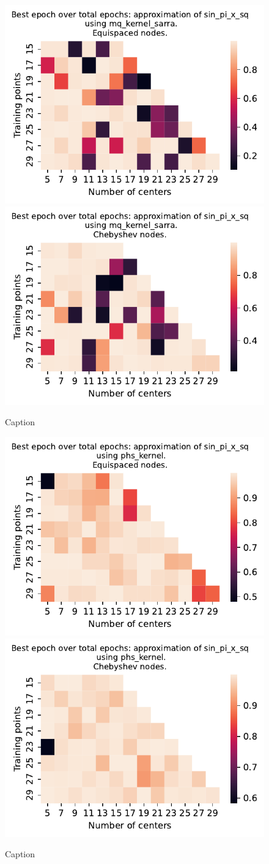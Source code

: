 \documentclass[12pt]{report} %
\begin{document}
\begin{figure}[ht]
  \centering

  \includegraphics[width=.49\textwidth]{imagenes/experiments/1d/variational_epochs/sin_pi_x_sq-Kmq_kernel_sarra-Equi-epochs.pdf}
  \includegraphics[width=.49\textwidth]{imagenes/experiments/1d/variational_epochs/sin_pi_x_sq-Kmq_kernel_sarra-Cheb-epochs.pdf}
  \caption{Caption}
  \label{fig:epochs-sin-pi-x-sq-sarra}
\end{figure}

\begin{figure}[ht]
  \centering

  \includegraphics[width=.49\textwidth]{imagenes/experiments/1d/variational_epochs/sin_pi_x_sq-Kphs_kernel-Equi-epochs.pdf}
  \includegraphics[width=.49\textwidth]{imagenes/experiments/1d/variational_epochs/sin_pi_x_sq-Kphs_kernel-Cheb-epochs.pdf}
  \caption{Caption}
  \label{fig:epochs-sin-pi-x-sq-phs}
\end{figure}
\end{document}
